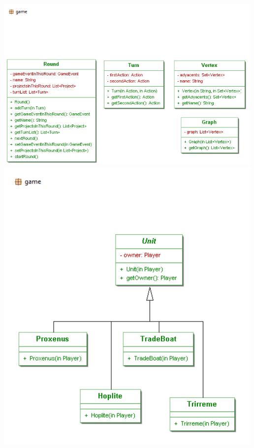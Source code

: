 \documentclass[11 pt]{book}
\begin{document}
\begin{center}
        \includegraphics[width=500px]{design-uml/game-round-turn-graph-vertex.png}
        \includegraphics[width=500px]{design-uml/game-units.png}

\end{center}
\end{document}
